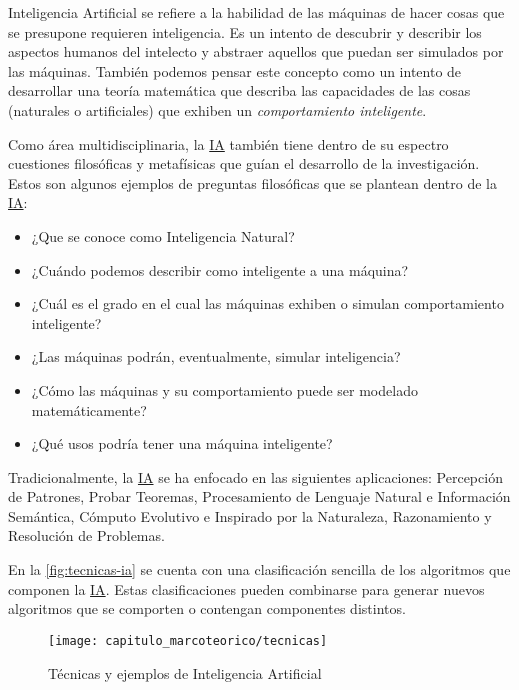 Inteligencia Artificial  se refiere a la
habilidad de las máquinas de hacer cosas que se presupone requieren
inteligencia. Es un intento de descubrir y describir los aspectos humanos del
intelecto y abstraer aquellos que puedan ser simulados por las máquinas. También
podemos pensar este concepto como un intento de desarrollar una teoría
matemática que describa las capacidades de las cosas (naturales o artificiales)
que exhiben un \emph{comportamiento inteligente}. 

Como área multidisciplinaria, la \hyperlink{abbr}{IA} también tiene dentro de su espectro
cuestiones filosóficas y metafísicas que guían el desarrollo de la
investigación. Estos son algunos ejemplos de preguntas filosóficas que se
plantean dentro de la \hyperlink{abbr}{IA}:

\begin{itemize}
    \item ¿Que se conoce como Inteligencia Natural?
    \item ¿Cuándo podemos describir como inteligente a una máquina?
    \item ¿Cuál es el grado en el cual las máquinas exhiben o simulan comportamiento inteligente?
    \item ¿Las máquinas podrán, eventualmente, simular inteligencia?
    \item ¿Cómo las máquinas y su comportamiento puede ser modelado matemáticamente?
    \item ¿Qué usos podría tener una máquina inteligente?
\end{itemize}

Tradicionalmente, la \hyperlink{abbr}{IA} se ha enfocado en las siguientes aplicaciones:
Percepción de Patrones, Probar Teoremas, Procesamiento de Lenguaje Natural e
Información Semántica, Cómputo Evolutivo e Inspirado por la Naturaleza,
Razonamiento y Resolución de Problemas. \cite{Jackson1985}

En la \autoref{fig:tecnicas-ia} se cuenta con una clasificación sencilla de los
algoritmos que componen la \hyperlink{abbr}{IA}. Estas clasificaciones pueden
combinarse para generar nuevos algoritmos que se comporten o contengan
componentes distintos.

\begin{figure}[H]
    \texttt{[image: capitulo\_marcoteorico/tecnicas]}
    \caption{Técnicas y ejemplos de Inteligencia Artificial}\label{fig:tecnicas-ia}
\end{figure}

